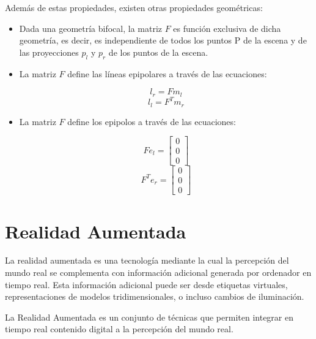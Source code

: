 Además de estas propiedades, existen otras propiedades geométricas:

\begin{itemize}
\item Dada una geometría bifocal, la matriz $F$ es función exclusiva de dicha geometría, es decir, es independiente de todos los puntos P de la escena y de las proyecciones $p_l$ y $p_r$ de los puntos de la escena.
\item La matriz $F$ define las líneas epipolares a través de las ecuaciones:

  \begin{equation}
    l_r=Fm_l
  \end{equation}
  \begin{equation}
    l_l=F^Tm_r
  \end{equation}

\item La matriz $F$ define los epipolos a través de las ecuaciones:

  \begin{equation}
    Fe_l=
    \begin{bmatrix}
      0 \\ 0 \\ 0
    \end{bmatrix}
  \end{equation}
  \begin{equation}
    F^Te_r=
    \begin{bmatrix}
      0 \\ 0 \\ 0
    \end{bmatrix}
  \end{equation}

\end{itemize}




\section{Realidad Aumentada}
La realidad aumentada es una tecnología mediante la cual la percepción del mundo real se complementa con información adicional generada por ordenador en tiempo real. Esta información adicional puede ser desde etiquetas virtuales, representaciones de modelos tridimensionales, o incluso cambios de iluminación. 


La Realidad Aumentada es un conjunto de técnicas que permiten integrar en tiempo real contenido digital a la percepción del mundo real.


